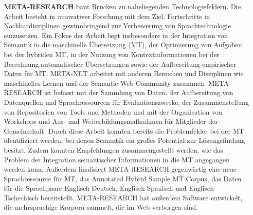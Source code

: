 \documentclass[]{../../metanetpaper}
\begin{document}
\begin{Parallel}[c]{80mm}{80mm}
{\textbf{META-RESEARCH} baut Brücken zu naheliegenden Technologiefeldern. Die Arbeit besteht in innovativer Forschung mit dem Ziel, Fortschritte in Nachbardisziplinen gewinnbringend zur Verbesserung von Sprachtechnologie einzusetzen. Ein Fokus der Arbeit liegt insbesondere in der Integration von Semantik in die maschinelle Übersetzung (MT), der Optimierung von Aufgaben bei der hybriden MT, in der Nutzung von Kontextinformationen bei der Berechnung automatischer Übersetzungen sowie der Aufbereitung empirischer Daten für MT. META-NET arbeitet mit anderen Bereichen und Disziplinen wie maschinelles Lernen und der Semantic Web Community zusammen. META-RESEARCH ist befasst mit der Sammlung von Daten, der Aufbereitung von Datenquellen und Sprachressourcen für Evaluationszwecke, der Zusammenstellung von Repositorien von Tools und Methoden und mit der Organisation von Workshops und Aus- und Weiterbildungsmaßnahmen für Mitglieder der Gemeinschaft. Durch diese Arbeit konnten bereits die Problemfelder bei der MT identifiziert werden, bei denen Semantik ein großes Potential zur Lösungsfindung besitzt. Zudem konnten Empfehlungen zusammengestellt werden, wie das Problem der Integration semantischer Informationen in die MT angegangen werden kann. Außerdem finalisiert META-RESEARCH gegenwärtig eine neue Sprachressource für MT, das Annotated Hybrid Sample MT Corpus, das Daten für die Sprachpaare Englisch-Deutsch, Englisch-Spanisch und Englisch-Tschechisch bereitstellt. META-RESEARCH hat außerdem Software entwickelt, die mehrsprachige Korpora sammelt, die im Web verborgen sind.
  }

\end{Parallel}
\end{document}

